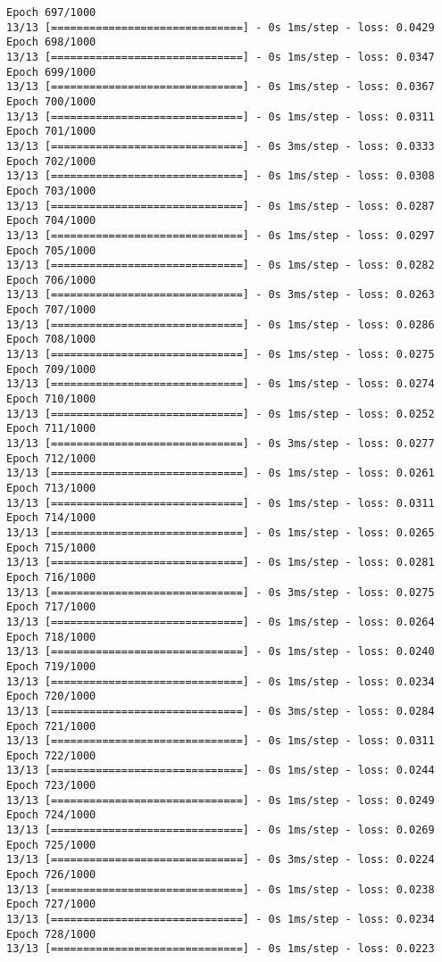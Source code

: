 \documentclass[11pt]{article}
\begin{document}
\begin{Verbatim}[commandchars=\\\{\}]
Epoch 697/1000
13/13 [==============================] - 0s 1ms/step - loss: 0.0429
Epoch 698/1000
13/13 [==============================] - 0s 1ms/step - loss: 0.0347
Epoch 699/1000
13/13 [==============================] - 0s 1ms/step - loss: 0.0367
Epoch 700/1000
13/13 [==============================] - 0s 1ms/step - loss: 0.0311
Epoch 701/1000
13/13 [==============================] - 0s 3ms/step - loss: 0.0333
Epoch 702/1000
13/13 [==============================] - 0s 1ms/step - loss: 0.0308
Epoch 703/1000
13/13 [==============================] - 0s 1ms/step - loss: 0.0287
Epoch 704/1000
13/13 [==============================] - 0s 1ms/step - loss: 0.0297
Epoch 705/1000
13/13 [==============================] - 0s 1ms/step - loss: 0.0282
Epoch 706/1000
13/13 [==============================] - 0s 3ms/step - loss: 0.0263
Epoch 707/1000
13/13 [==============================] - 0s 1ms/step - loss: 0.0286
Epoch 708/1000
13/13 [==============================] - 0s 1ms/step - loss: 0.0275
Epoch 709/1000
13/13 [==============================] - 0s 1ms/step - loss: 0.0274
Epoch 710/1000
13/13 [==============================] - 0s 1ms/step - loss: 0.0252
Epoch 711/1000
13/13 [==============================] - 0s 3ms/step - loss: 0.0277
Epoch 712/1000
13/13 [==============================] - 0s 1ms/step - loss: 0.0261
Epoch 713/1000
13/13 [==============================] - 0s 1ms/step - loss: 0.0311
Epoch 714/1000
13/13 [==============================] - 0s 1ms/step - loss: 0.0265
Epoch 715/1000
13/13 [==============================] - 0s 1ms/step - loss: 0.0281
Epoch 716/1000
13/13 [==============================] - 0s 3ms/step - loss: 0.0275
Epoch 717/1000
13/13 [==============================] - 0s 1ms/step - loss: 0.0264
Epoch 718/1000
13/13 [==============================] - 0s 1ms/step - loss: 0.0240
Epoch 719/1000
13/13 [==============================] - 0s 1ms/step - loss: 0.0234
Epoch 720/1000
13/13 [==============================] - 0s 3ms/step - loss: 0.0284
Epoch 721/1000
13/13 [==============================] - 0s 1ms/step - loss: 0.0311
Epoch 722/1000
13/13 [==============================] - 0s 1ms/step - loss: 0.0244
Epoch 723/1000
13/13 [==============================] - 0s 1ms/step - loss: 0.0249
Epoch 724/1000
13/13 [==============================] - 0s 1ms/step - loss: 0.0269
Epoch 725/1000
13/13 [==============================] - 0s 3ms/step - loss: 0.0224
Epoch 726/1000
13/13 [==============================] - 0s 1ms/step - loss: 0.0238
Epoch 727/1000
13/13 [==============================] - 0s 1ms/step - loss: 0.0234
Epoch 728/1000
13/13 [==============================] - 0s 1ms/step - loss: 0.0223

\end{Verbatim}
\end{document}
